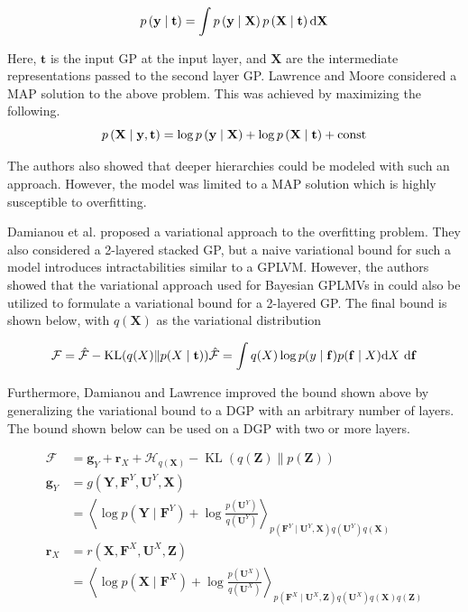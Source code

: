 \documentclass[letterpaper,11pt]{extarticle}
\begin{document}
$$
p\left(\mathbf{y}\mid\mathbf{t}\right) =\int p\left(\mathbf{y}\mid\mathbf{X}\right) p\left(\mathbf{X}\mid\mathbf{t}\right)\mathrm{d} \mathbf{X} \\
$$

Here, $\mathbf{t}$ is the input GP at the input layer, and $\mathbf{X}$ are the intermediate representations passed to the second layer GP. Lawrence and Moore considered a MAP solution to the above problem. This was achieved by maximizing the following. 
$$
p\left(\mathbf{X}\mid\mathbf{y, t}\right) =\log p\left(\mathbf{y}\mid\mathbf{X}\right) + \log p\left(\mathbf{X}\mid\mathbf{t}\right) + \text {const} \\
$$

The authors also showed that deeper hierarchies could be modeled with such an approach. However, the model was limited to a MAP solution which is highly susceptible to overfitting.  

Damianou et al. \cite{DamianouTL11, damianou15} proposed a variational approach to the overfitting problem. They also considered a 2-layered stacked GP, but a naive variational bound for such a model introduces intractabilities similar to a GPLVM.  However, the authors showed that the variational approach used for Bayesian GPLMVs in \cite{TitsiasL10} could also be utilized to formulate a variational bound for a 2-layered GP. The final bound is shown below, with $q(\mathbf{X})$ as the variational distribution

$$
\mathcal{F}=\hat{\mathcal{F}}-\operatorname{KL}(q(X) \| p(X \mid \mathbf{t})) \\
\hat{\mathcal{F}}=\int q(X) \log p(y \mid \mathbf{f}) p(\mathbf{f} \mid X) \mathrm{d} X \mathrm{~d} \mathbf{f}
$$

Furthermore, Damianou and Lawrence \cite{DamianouL13} improved the bound shown above by generalizing the variational bound to a DGP with an arbitrary number of layers. The bound shown below can be used on a DGP with two or more layers. 

$$
\begin{aligned}
\mathcal{F}&=\mathbf{g}_{Y}+\mathbf{r}_{X}+\mathcal{H}_{q(\mathbf{X})}-\operatorname{KL}(q(\mathbf{Z}) \| p(\mathbf{Z})) \\
\mathbf{g}_{Y}&=g\left(\mathbf{Y}, \mathbf{F}^{Y}, \mathbf{U}^{Y}, \mathbf{X}\right) \\
\quad&=\left\langle\log p\left(\mathbf{Y} \mid \mathbf{F}^{Y}\right)+\log \frac{p\left(\mathbf{U}^{Y}\right)}{q\left(\mathbf{U}^{Y}\right)}\right\rangle_{p\left(\mathbf{F}^{Y} \mid \mathbf{U}^{Y}, \mathbf{X}\right) q\left(\mathbf{U}^{Y}\right) q(\mathbf{X})} \\
\mathbf{r}_{X}&=r\left(\mathbf{X}, \mathbf{F}^{X}, \mathbf{U}^{X}, \mathbf{Z}\right) \\
&=\left\langle\log p\left(\mathbf{X} \mid \mathbf{F}^{X}\right)+\log \frac{p\left(\mathbf{U}^{X}\right)}{q\left(\mathbf{U}^{X}\right)}\right\rangle_{p\left(\mathbf{F}^{X} \mid \mathbf{U}^{X}, \mathbf{Z}\right) q\left(\mathbf{U}^{X}\right) q(\mathbf{X}) q(\mathbf{Z})}
\end{aligned}
$$
\end{document}
